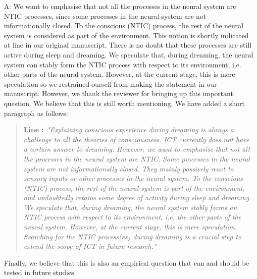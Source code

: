 \documentclass[utf8]{article}
\newenvironment{ans}  
    {\color{Black}\noindent A:}
    {~\newline}
\newcommand{\addnew}[2]{\blockcquote{}{\textbf{Line #1:}~\newline\textit{"#2"}}
}
\begin{document}
    	\begin{ans}
	    	We want to emphasise that not all the processes in the neural system are NTIC processes, since some processes in the neural system are not informationally closed.
	    	To the conscious (NTIC) process, the rest of the neural system is considered as part of the environment. This notion is shortly indicated at line  in our original manuscript. There is no doubt that these processes are still active during sleep and dreaming. We speculate that, during dreaming, the neural system can stably form the NTIC process with respect to its environment, i.e. other parts of the neural system.  However, at the current stage, this is mere speculation so we restrained ourself from making the statement in our manuscript. However, we thank the reviewer for bringing up this important question. We believe that this is still worth mentioning. We have added a short paragraph as follows:
	    	
			\addnew{}{Explaining conscious experience during dreaming is always a challenge to all the theories of consciousness. ICT currently does not have a certain answer to dreaming. However, we want to emphasise that not all the processes in the neural system are NTIC. Some processes in the neural system are not informationally closed. They mainly passively react to sensory inputs or other processes in the neural system. To the conscious (NTIC) process, the rest of the neural system is part of the environment, and undoubtedly retains some degree of activity during sleep and dreaming. We speculate that, during dreaming, the neural system stably forms an NTIC process with respect to its environment, i.e. the other parts of the neural system. However, at the current stage, this is mere speculation. Searching for the NTIC process(es) during dreaming is a crucial step to extend the scope of ICT in future research.}
	    	
	    	Finally, we believe that this is also an empirical question that can and should be tested in future studies.
    	\end{ans}
        
\end{document}
